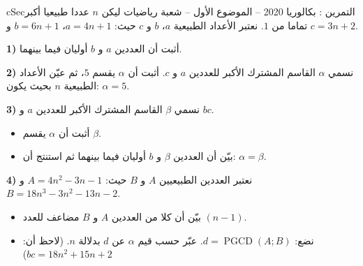 \documentclass[12pt,a4paper]{article}
\newenvironment{BOX}[2]{\begin{otherlanguage}{english}\begin{arbox}{#1}{#2}}{\end{arbox}\end{otherlanguage}}
\newcounter{exo}
\newenvironment{tamrin}[1]{\stepcounter{exo}\begin{BOX}{cSec}{التمرين \theexo: #1}}{\end{BOX}}
\newcommand{\pgcd}{\operatorname{PGCD}}
\newenvironment{sq}{\begin{itemize}[leftmargin=2.4em,itemsep=3pt]}{\end{itemize}}
\newcommand{\qa}{\item[(أ)]}\newcommand{\qb}{\item[(ب)]}\newcommand{\qc}{\item[(جـ)]}\newcommand{\qd}{\item[(د)]}\newcommand{\qe}{\item[(هـ)]}
\begin{document}
\begin{tamrin}{بكالوريا 2020 -- الموضوع الأول -- شعبة رياضيات}
ليكن $n$ عددا طبيعيا أكبر تماما من $1$.
نعتبر الأعداد الطبيعية $a$، $b$ و $c$ حيث: $a=4n+1$، $b=6n+1$ و $c=3n+2$.

\textbf{1)} أثبت أن العددين $a$ و $b$ أوليان فيما بينهما.

\textbf{2)} نسمي $\alpha$ القاسم المشترك الأكبر للعددين $a$ و $c$.
أثبت أن $\alpha$ يقسم $5$، ثم عيّن الأعداد الطبيعية $n$ بحيث يكون: $\alpha=5$.

\textbf{3)} نسمي $\beta$ القاسم المشترك الأكبر للعددين $a$ و $bc$.
\begin{sq}
\qa أثبت أن $\alpha$ يقسم $\beta$.
\qb بيّن أن العددين $\beta$ و $b$ أوليان فيما بينهما ثم استنتج أن: $\alpha=\beta$.
\end{sq}
\textbf{4)} نعتبر العددين الطبيعيين $A$ و $B$ حيث: $A=4n^2-3n-1$ و $B=18n^3-3n^2-13n-2$.
\begin{sq}
\qa بيّن أن كلا من العددين $A$ و $B$ مضاعف للعدد $(n-1)$.
\qb نضع: $d=\pgcd(A;B)$. عبّر حسب قيم $\alpha$ عن $d$ بدلالة $n$. (لاحظ أن: $bc=18n^2+15n+2$)
\end{sq}
\end{tamrin}
\end{document}
